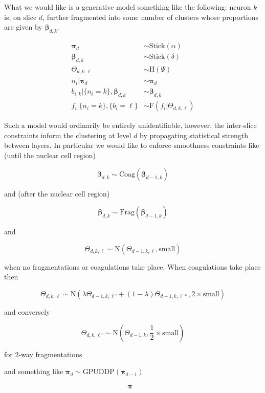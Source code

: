 \documentclass{article}
\begin{document}
What we would like is a generative model something like the following:  neuron $k$ is, on slice $d$, further fragmented into some number of clusters whose proportions are given by $\boldsymbol\beta_{d,k}$.  

\begin{align}
\boldsymbol\pi_d & \sim \text{Stick}(\alpha)\\
\boldsymbol\beta_{d,k} & \sim \text{Stick}(\delta)\\
\Theta_{d, k,\ell} & \sim \text{H}(\Psi) \\
n_i | \boldsymbol\pi_d & \sim \boldsymbol\pi_d \\
b_{i,k} | \{n_i = k \}, \boldsymbol\beta_{d,k}  &  \sim \boldsymbol\beta_{d,k} \\
f_{i} | \{ n_i = k \}, \{ b_i = \ell \} & \sim \text{F}(f_{i} |\Theta_{d, k,\ell})
\end{align}

Such a model would ordinarily be entirely unidentifiable, however, the inter-slice constraints inform the clustering at level $d$ by propagating statistical strength between layers.  In particular we would like to enforce smoothness  constraints like (until the nuclear cell region)

\[\boldsymbol\beta_{d,k} \sim \text{Coag}(\boldsymbol\beta_{d-1,k})\] 

and  (after the nuclear cell region)

\[\boldsymbol\beta_{d,k} \sim \text{Frag}(\boldsymbol\beta_{d-1,k})\] 

and 

\[\Theta_{d, k,\ell} \sim \text{N}(\Theta_{d-1, k,\ell},\text{small})\]

when no fragmentations or coagulations take place.  When coagulations take place then 

\[\Theta_{d, k,\ell} \sim \text{N}(\lambda \Theta_{d-1, k,\ell'} + (1-\lambda)\Theta_{d-1, k,\ell*},2\times\text{small})\]

and conversely 

\[\Theta_{d, k,\ell'} \sim \text{N}(\Theta_{d-1, k},\frac{1}{2}\times\text{small})\] 

for 2-way fragmentations


and something like $\boldsymbol\pi_d \sim \text{GPUDDP}(\boldsymbol\pi_{d-1})$

\begin{align}
\boldsymbol\pi_{} & 
\end{align}



\end{document}
